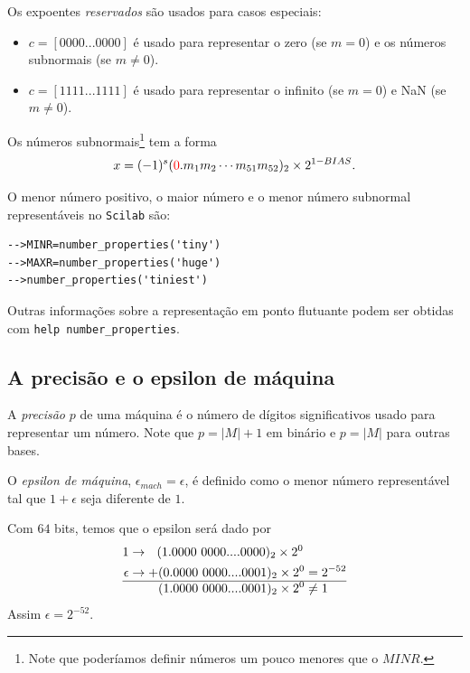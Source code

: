 \documentclass[main.tex]{subfiles}
\begin{document}
Os expoentes \emph{reservados} são usados para casos especiais:
\begin{itemize}
 \item $c=[0000...0000]$ é usado para representar o zero (se $m=0$) e os números subnormais (se $m\neq 0$).
 \item $c=[1111...1111]$ é usado para representar o infinito (se $m=0$) e NaN (se $m\neq 0$).
\end{itemize}

Os números subnormais\footnote{Note que poderíamos definir números um pouco menores que o $MINR$.} tem a forma
$$ x=(-1)^{s}({\color{red}{0}}.m_{1}m_{2}\cdots m_{51}m_{52})_2 \times 2^{1-BIAS}.$$

\ifisscilab
\begin{obs}
  O menor número positivo, o maior número e o menor número subnormal representáveis  no \verb+Scilab+ são:
\begin{verbatim}
-->MINR=number_properties('tiny')
-->MAXR=number_properties('huge')
-->number_properties('tiniest')
\end{verbatim}
Outras informações sobre a representação em ponto flutuante podem ser obtidas com \verb+help number_properties+.
\end{obs}
\fi

\subsection{A precisão e o epsilon de máquina}

A \emph{precisão} $p$ de uma máquina é o número de dígitos significativos usado para representar um número. Note que $p=|M|+1$ em binário e $p=|M|$ para outras bases.

O \emph{epsilon de máquina}, $\epsilon_{mach}=\epsilon$, é definido como o menor número representável tal que $1+\epsilon$ seja diferente de $1$.

\begin{ex}
  Com $64$ bits, temos que o epsilon será dado por
\begin{align*}
  1      &\rightarrow ~~(1.0000~0000....0000)_2\times 2^{0} \\
\epsilon &\rightarrow  +(0.0000~0000....0001)_2\times 2^{0}  = 2^{-52} \\ \hline
         &      ~~~~~~~ (1.0000~0000....0001)_2\times 2^{0} \neq 1
\end{align*}
Assim $\epsilon = 2^{-52}$.
\end{ex}
\end{document}
